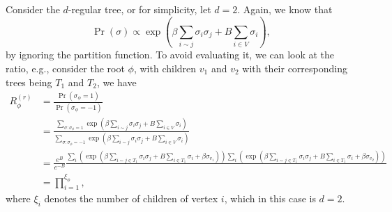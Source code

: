 \begin{eg}
	Consider the \(d\)-regular tree, or for simplicity, let \(d = 2\). Again, we know that
	\[
		\Pr_{}\left(\sigma \right)
		\propto \exp (\beta \sum_{i \sim j} \sigma _i \sigma _j + B \sum_{i \in V} \sigma _i),
	\]
	by ignoring the partition function. To avoid evaluating it, we can look at the ratio, e.g., consider the root \(\phi \), with children \(v_1\) and \(v_2\) with their corresponding trees being \(T_1\) and \(T_2\), we have
	\[
		\begin{split}
			R_{\phi }^{(r)}
			 & = \frac{\Pr_{}\left(\sigma _\phi = 1\right) }{\Pr_{}\left(\sigma _\phi = -1\right) }                                                                                                                                                                                                                      \\
			 & = \frac{\sum_{\sigma \colon \sigma _\phi = 1} \exp (\beta \sum_{i \sim j} \sigma _i \sigma _j + B \sum_{i \in V} \sigma _i)}{\sum_{\sigma \colon \sigma _\phi = -1} \exp (\beta \sum_{i \sim j} \sigma _i \sigma _j + B \sum_{i \in V} \sigma _i)}                                                        \\
			 & = \frac{e^B}{e^{-B}} \frac{\sum_{i} \left( \exp (\beta \sum_{i \sim j \in T_1} \sigma _i \sigma _j + B \sum_{i \in T_1} \sigma _i + \beta \sigma _{v_1}) \right) \sum_{i} \left( \exp (\beta \sum_{i \sim j \in T_1} \sigma _i \sigma _j + B \sum_{i \in T_1} \sigma _i + \beta \sigma _{v_2}) \right)}{} \\
			 & = \prod_{i=1}^{\xi _\phi } ,
		\end{split}
	\]
	where \(\xi _i\) denotes the number of children of vertex \(i\), which in this case is \(d = 2\).
\end{eg}